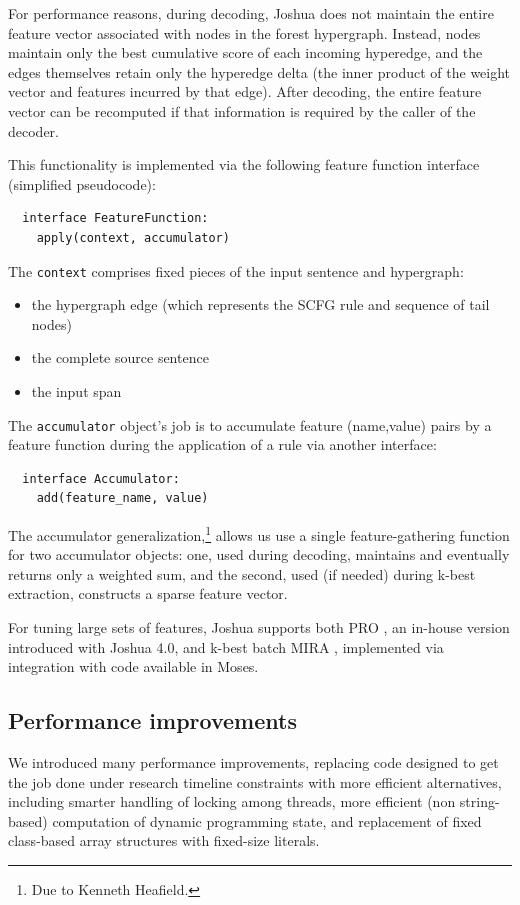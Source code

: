 \documentclass[11pt]{article}
\begin{document}
For performance reasons, during decoding, Joshua does not maintain the
entire feature vector associated with nodes in the forest hypergraph.
Instead, nodes maintain only the best cumulative score of each
incoming hyperedge, and the edges themselves retain only the hyperedge
delta (the inner product of the weight vector and features incurred by
that edge).  After decoding, the entire feature vector can be
recomputed if that information is required by the caller of the
decoder.  

This functionality is implemented via the following
feature function interface (simplified pseudocode):
%
\begin{verbatim}
  interface FeatureFunction:
    apply(context, accumulator)
\end{verbatim}
%
The \verb|context| comprises fixed pieces of the input sentence and
hypergraph:
%
\begin{itemize}
\item the hypergraph edge (which represents the SCFG rule and sequence
  of tail nodes)
\item the complete source sentence
\item the input span
\end{itemize}
%
The \verb|accumulator| object's job is to accumulate feature
(name,value) pairs by a feature function during the application of a
rule via another interface:
%
\begin{verbatim}
  interface Accumulator:
    add(feature_name, value)
\end{verbatim}
%
The accumulator generalization,\footnote{Due to Kenneth Heafield.}
allows us use a single feature-gathering function for two accumulator
objects: one, used during decoding, maintains and eventually returns
only a weighted sum, and the second, used (if needed) during k-best
extraction, constructs a sparse feature vector.

For tuning large sets of features, Joshua supports both PRO
\cite{PRO2011}, an in-house version introduced with Joshua 4.0, and
k-best batch MIRA \cite{cherry2012batch}, implemented via integration
with code available in Moses.

\subsection{Performance improvements}
\label{sec:performance}

We introduced many performance improvements, replacing code designed
to get the job done under research timeline constraints with more
efficient alternatives, including smarter handling of locking among
threads, more efficient (non string-based) computation of dynamic
programming state, and replacement of fixed class-based array
structures with fixed-size literals.
\end{document}
